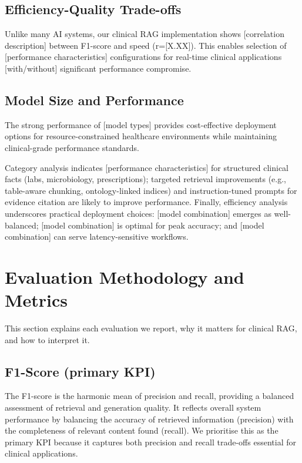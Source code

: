\subsection{Efficiency-Quality Trade-offs}
Unlike many AI systems, our clinical RAG implementation shows [correlation description] between F1-score and speed (r=[X.XX]). This enables selection of [performance characteristics] configurations for real-time clinical applications [with/without] significant performance compromise.

\subsection{Model Size and Performance}
The strong performance of [model types] provides cost-effective deployment options for resource-constrained healthcare environments while maintaining clinical-grade performance standards.

Category analysis indicates [performance characteristics] for structured clinical facts (labs, microbiology, prescriptions); targeted retrieval improvements (e.g., table-aware chunking, ontology-linked indices) and instruction-tuned prompts for evidence citation are likely to improve performance. Finally, efficiency analysis underscores practical deployment choices: [model combination] emerges as well-balanced; [model combination] is optimal for peak accuracy; and [model combination] can serve latency-sensitive workflows.

\section{Evaluation Methodology and Metrics}
This section explains each evaluation we report, why it matters for clinical RAG, and how to interpret it.

\subsection{F1-Score (primary KPI)}
The F1-score is the harmonic mean of precision and recall, providing a balanced assessment of retrieval and generation quality. It reflects overall system performance by balancing the accuracy of retrieved information (precision) with the completeness of relevant content found (recall). We prioritise this as the primary KPI because it captures both precision and recall trade-offs essential for clinical applications.

